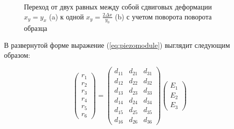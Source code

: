\begin{figure}[H]
  \centering
  \hfill
  \caption{Переход от двух равных между собой сдвиговых деформации
  $x_y = y_x$ (a) к одной $x_y=\frac{2\Delta x}{y_0}$ (b) с учетом поворота
  поворота образца}
  \label{ris:2x_y_1}
\end{figure}

В развернутой форме выражение (\ref{eq:piezomodule}) выглядит следующим образом:

\begin{equation}
  \begin{pmatrix}
  r_1 \\
  r_2 \\
  r_3 \\
  r_4 \\
  r_5 \\
  r_6
  \end{pmatrix}
   = \begin{pmatrix}
  d_{11} & d_{21}  & d_{31} \\
  d_{12} & d_{22}  & d_{32} \\
  d_{13} & d_{23}  & d_{33} \\
  d_{14} & d_{24}  & d_{34} \\
  d_{15} & d_{25}  & d_{35} \\
  d_{16} & d_{26}  & d_{36}
  \end{pmatrix}
  \begin{pmatrix}
  E_1 \\
  E_2 \\
  E_3
  \end{pmatrix}
  \label{eq:piezomodule_matrica}
\end{equation}

